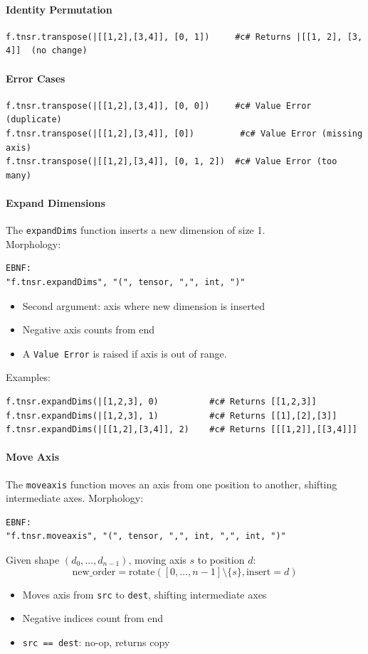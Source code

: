 \paragraph{Identity Permutation}
\begin{verbatim}
f.tnsr.transpose(|[[1,2],[3,4]], [0, 1])     #c# Returns |[[1, 2], [3, 4]]  (no change)
\end{verbatim}

\paragraph{Error Cases}
\begin{verbatim}
f.tnsr.transpose(|[[1,2],[3,4]], [0, 0])     #c# Value Error (duplicate)
f.tnsr.transpose(|[[1,2],[3,4]], [0])         #c# Value Error (missing axis)
f.tnsr.transpose(|[[1,2],[3,4]], [0, 1, 2])  #c# Value Error (too many)
\end{verbatim}

\paragraph{Expand Dimensions}
The \texttt{expandDims} function inserts a new dimension of size 1.\\
Morphology:
\begin{verbatim}
EBNF:
"f.tnsr.expandDims", "(", tensor, ",", int, ")"
\end{verbatim}
\begin{itemize}
\item Second argument: axis where new dimension is inserted
\item Negative axis counts from end
\item A \texttt{Value Error} is raised if axis is out of range.
\end{itemize}
Examples:
\begin{verbatim}
f.tnsr.expandDims(|[1,2,3], 0)          #c# Returns [[1,2,3]]
f.tnsr.expandDims(|[1,2,3], 1)          #c# Returns [[1],[2],[3]]
f.tnsr.expandDims(|[[1,2],[3,4]], 2)    #c# Returns [[[1,2]],[[3,4]]]
\end{verbatim}

\paragraph{Move Axis}
The \texttt{moveaxis} function moves an axis from one position to another, shifting intermediate axes.
Morphology:
\begin{verbatim}
EBNF:
"f.tnsr.moveaxis", "(", tensor, ",", int, ",", int, ")"
\end{verbatim}
Given shape $(d_0, \ldots, d_{n-1})$, moving axis $s$ to position $d$:
\[
\text{new\_order} = \text{rotate}( [0, \ldots, n{-}1] \setminus \{s\}, \text{insert}=d )
\]
\begin{itemize}
\item Moves axis from \texttt{src} to \texttt{dest}, shifting intermediate axes
\item Negative indices count from end
\item \texttt{src == dest}: no-op, returns copy
\end{itemize}

